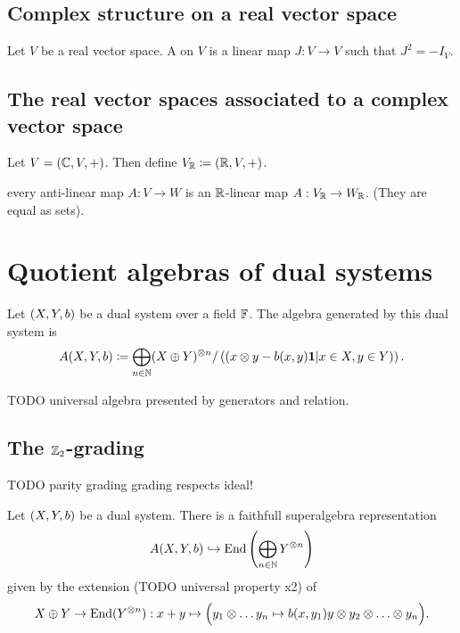 \subsection{Complex structure on a real vector space}
\begin{definition}
Let $V$ be a real vector space. A  on $V$ is a linear map $J: V\to V$ such that $J^2 = -I_V$.
\end{definition}

\subsection{The real vector spaces associated to a complex vector space}
Let $V = (\mathbb{C}, V, +)$. Then define $V_{\mathbb{R}} \coloneqq (\mathbb{R},V,+)$.

every anti-linear map $A:V\to W$ is an $\mathbb{R}$-linear map $A:V_{\mathbb{R}}\to W_{\mathbb{R}}$. (They are equal as sets).

\section{Quotient algebras of dual systems}
\begin{definition}
Let $\sSet{X,Y,b}$ be a dual system over a field $\mathbb{F}$. The algebra generated by this dual system is
\[ A(X,Y,b) \coloneqq \bigoplus_{n\in\mathbb{N}}(X\oplus Y)^{\otimes n}/\left(\left(x\otimes y - b(x,y)\boldsymbol{\mathrm{1}}\middle|x\in X, y\in Y\right)\right). \]
\end{definition}
TODO universal algebra presented by generators and relation.

\subsection{The $\mathbb{Z}_2$-grading}
TODO parity grading grading respects ideal!

\begin{proposition}
Let $\sSet{X,Y,b}$ be a dual system. There is a faithfull superalgebra representation
\[ A(X,Y,b) \hookrightarrow \operatorname{End}\left(\bigoplus_{n\in \mathbb{N}}Y^{\otimes n}\right) \]
given by the extension (TODO universal property x2) of
\[ X\oplus Y \to \operatorname{End}(Y^{\otimes n}): x+y \mapsto \Big( y_1\otimes\ldots y_n \mapsto b(x,y_1) y\otimes y_2\otimes \ldots \otimes y_n \Big). \]
\end{proposition}

